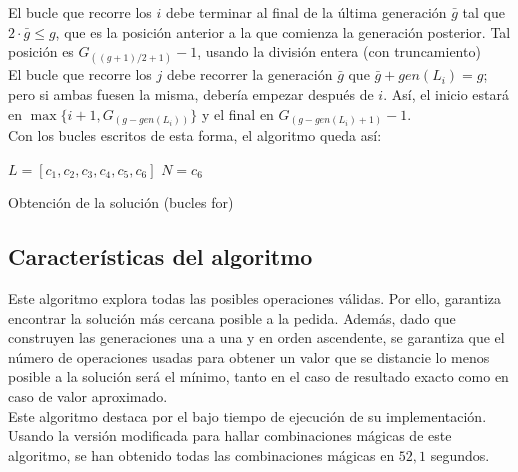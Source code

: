 El bucle que recorre los $i$ debe terminar al final de la última generación $\bar g$ tal que $2\cdot \bar g \le g$, que es la posición anterior a la que comienza la generación posterior. Tal posición es $G_{((g+1)/2+1)}-1$, usando la división entera (con truncamiento)\\

El bucle que recorre los $j$ debe recorrer la generación $\bar g$ que $\bar g + gen(L_i) = g$; pero si ambas fuesen la misma, debería empezar después de $i$. Así, el inicio estará en $\max \{i+1, G_{(g-gen(L_i))}\}$ y el final en $G_{(g-gen(L_i)+1)}-1$.\\

Con los bucles escritos de esta forma, el algoritmo queda así:

\begin{algorithm}[H]
	
	$L = [c_1, c_2, c_3, c_4, c_5, c_6]$\;
	$N = c_6$\;
	\caption{Obtención de la solución (bucles for)}
\end{algorithm}

\subsection{Características del algoritmo}
Este algoritmo explora todas las posibles operaciones válidas.
Por ello, garantiza encontrar la solución más cercana posible a la pedida.
Además, dado que construyen las generaciones una a una y en orden ascendente,
se garantiza que el número de operaciones usadas para obtener un valor que se
distancie lo menos posible a la solución será el mínimo, tanto en el caso de
resultado exacto como en caso de valor aproximado.\\

Este algoritmo destaca por el bajo tiempo de ejecución de su implementación. Usando la versión modificada para hallar combinaciones mágicas de este algoritmo, se han obtenido todas las combinaciones mágicas en $52,1$ segundos.\\

